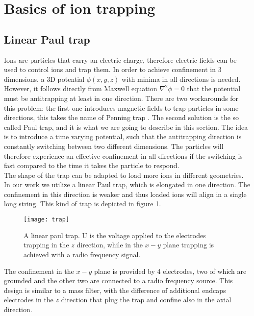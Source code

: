 
\section{Basics of ion trapping}
\subsection{Linear Paul trap}
Ions are particles that carry an electric charge, therefore electric fields can be used to control ions and trap them. In order to achieve confinement in 3 dimensions, a 3D potential $\phi(x,y,z)$ with minima in all directions is needed. However, it follows directly from Maxwell equation $\nabla^2 \phi = 0$ that the potential must be antitrapping at least in one direction. There are two workarounds for this problem: the first one introduces magnetic fields to trap particles in some directions, this takes the name of Penning trap \cite{RevModPhys.58.233}. The second solution is the so called Paul trap, and it is what we are going to describe in this section. The idea is to introduce a time varying potential, such that the antitrapping direction is constantly switching between two different dimensions. The particles will therefore experience an effective confinement in all directions if the switching is fast compared to the time it takes the particle to respond.\\
The shape of the trap can be adapted to load more ions in different geometries. In our work we utilize a linear Paul trap, which is elongated in one direction. The confinement in this direction is weaker and thus loaded ions will align in a single long string. This kind of trap is depicted in figure \ref{trap}.
\begin{figure}[H]
\centering
\texttt{[image: trap]}
\caption{A linear paul trap. U is the voltage applied to the electrodes trapping in the $z$ direction, while in the $x-y$ plane trapping is achieved with a radio frequency signal.}
\label{trap}
\end{figure}
The confinement in the $x-y$ plane is provided by 4 electrodes, two of which are grounded and the other two are connected to a radio frequency source. This design is similar to a mass filter, with the difference of additional endcaps electrodes in the $z$ direction that plug the trap and confine also in the axial direction.\\

